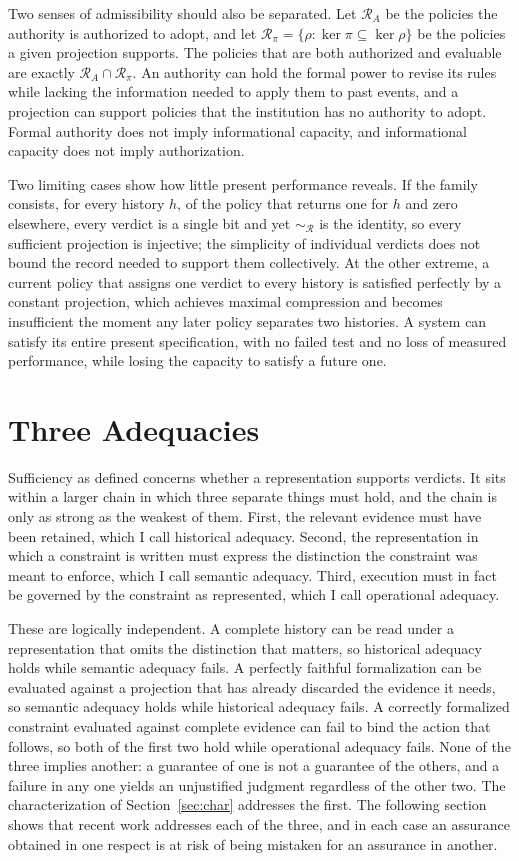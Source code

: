 \documentclass[11pt]{article}
\theoremstyle{remark}
\newcommand{\Rev}{\mathcal{R}}
\renewcommand{\ker}{\operatorname{ker}}
\begin{document}
Two senses of admissibility should also be separated. Let $\Rev_A$ be the policies the authority is authorized to adopt, and let $\Rev_\pi=\{\rho:\ker\pi\subseteq\ker\rho\}$ be the policies a given projection supports. The policies that are both authorized and evaluable are exactly $\Rev_A\cap\Rev_\pi$. An authority can hold the formal power to revise its rules while lacking the information needed to apply them to past events, and a projection can support policies that the institution has no authority to adopt. Formal authority does not imply informational capacity, and informational capacity does not imply authorization.

Two limiting cases show how little present performance reveals. If the family consists, for every history $h$, of the policy that returns one for $h$ and zero elsewhere, every verdict is a single bit and yet $\sim_{\Rev}$ is the identity, so every sufficient projection is injective; the simplicity of individual verdicts does not bound the record needed to support them collectively. At the other extreme, a current policy that assigns one verdict to every history is satisfied perfectly by a constant projection, which achieves maximal compression and becomes insufficient the moment any later policy separates two histories. A system can satisfy its entire present specification, with no failed test and no loss of measured performance, while losing the capacity to satisfy a future one.

\section{Three Adequacies}\label{sec:adeq}

Sufficiency as defined concerns whether a representation supports verdicts. It sits within a larger chain in which three separate things must hold, and the chain is only as strong as the weakest of them. First, the relevant evidence must have been retained, which I call historical adequacy. Second, the representation in which a constraint is written must express the distinction the constraint was meant to enforce, which I call semantic adequacy. Third, execution must in fact be governed by the constraint as represented, which I call operational adequacy.

These are logically independent. A complete history can be read under a representation that omits the distinction that matters, so historical adequacy holds while semantic adequacy fails. A perfectly faithful formalization can be evaluated against a projection that has already discarded the evidence it needs, so semantic adequacy holds while historical adequacy fails. A correctly formalized constraint evaluated against complete evidence can fail to bind the action that follows, so both of the first two hold while operational adequacy fails. None of the three implies another: a guarantee of one is not a guarantee of the others, and a failure in any one yields an unjustified judgment regardless of the other two. The characterization of Section~\ref{sec:char} addresses the first. The following section shows that recent work addresses each of the three, and in each case an assurance obtained in one respect is at risk of being mistaken for an assurance in another.
\end{document}
